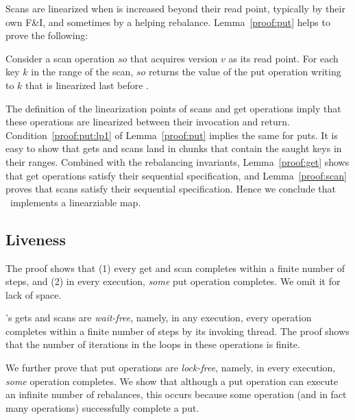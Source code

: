 Scans are linearized when  is increased beyond their read point, typically by their own F\&I, and sometimes by a helping rebalance. 
Lemma~\ref{proof:put} helps to prove the following:
\begin{lemma}
\label{proof:scan}
Consider a scan operation $so$ that acquires version $v$ as its read point. For each key $k$ in the range of the scan, $so$ returns the value of the put operation writing to $k$ that is linearized last before .
\end{lemma}

The definition of the linearization points of scans and get operations imply that these operations are linearized between their invocation and return.
Condition~\ref{proof:put:lp1} of Lemma~\ref{proof:put} implies the same for puts. 
It is easy to show that gets and scans land in chunks that contain the saught keys in their ranges. Combined with the rebalancing invariants,
Lemma~\ref{proof:get} shows that get operations satisfy their sequential specification, and Lemma~\ref{proof:scan} proves that scans satisfy their sequential specification. 
Hence we conclude that \kiwi\ implements a linearziable map. 


\subsection{Liveness}
\label{sec:live}


The proof shows that (1) every get and scan completes within a finite number of steps, and (2) in every execution, \emph{some} put operation completes. We omit it for lack of space.

 {\kiwi}'s gets and scans are \emph{wait-free}, namely, in any execution, every operation completes within a finite number of steps by its invoking thread. The proof shows that the number of iterations in the loops in these operations is finite. 

We further prove that put operations are \emph{lock-free}, namely, in every execution, \emph{some} operation completes. We show that although a put operation can execute an infinite number of rebalances, this occurs because 
some operation (and in fact many operations) successfully complete a put.

